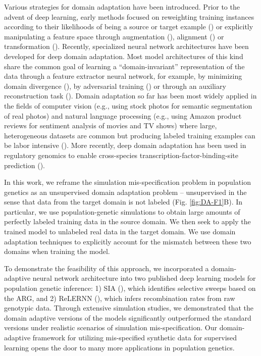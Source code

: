Various strategies for domain adaptation have been introduced. Prior to the advent of deep learning, early methods focused on reweighting training instances according to their likelihoods of being a source or target example (\cite{shimodaira_improving_2000,dai_boosting_2007}) or explicitly manipulating a feature space through augmentation (\cite{daume_iii_frustratingly_2009}), alignment (\cite{fernando_unsupervised_2013,sun_return_2016}) or transformation (\cite{pan_domain_2011}). Recently, specialized neural network architectures have been developed for deep domain adaptation. Most model architectures of this kind share the common goal of learning a “domain-invariant” representation of the data through a feature extractor neural network, for example, by minimizing domain divergence (\cite{rozantsev_beyond_2019}), by adversarial training (\cite{ganin_unsupervised_2014,liu_coupled_2016}) or through an auxiliary reconstruction task (\cite{ghifary_deep_2016}). Domain adaptation so far has been most widely applied in the fields of computer vision (e.g., using stock photos for semantic segmentation of real photos) and natural language processing (e.g., using Amazon product reviews for sentiment analysis of movies and TV shows) where large, heterogeneous datasets are common but producing labeled training examples can be labor intensive (\cite{wilson_survey_2020}). More recently, deep domain adaptation has been used in regulatory genomics to enable cross-species transcription-factor-binding-site prediction (\cite{cochran_domain-adaptive_2022}).

In this work, we reframe the simulation mis-specification problem in population genetics as an unsupervised domain adaptation problem -- unsupervised in the sense that data from the target domain is not labeled (Fig. \ref{fig:DA-F1}B). In particular, we use population-genetic simulations to obtain large amounts of perfectly labeled training data in the source domain. We then seek to apply the trained model to unlabeled real data in the target domain. We use domain adaptation techniques to explicitly account for the mismatch between these two domains when training the model.

To demonstrate the feasibility of this approach, we incorporated a domain-adaptive neural network architecture into two published deep learning models for population genetic inference: 1) SIA (\cite{hejase_deep-learning_2022}), which identifies selective sweeps based on the \acf{ARG}, and 2) ReLERNN (\cite{adrion_predicting_2020}), which infers recombination rates from raw genotypic data. Through extensive simulation studies, we demonstrated that the domain adaptive versions of the models significantly outperformed the standard versions under realistic scenarios of simulation mis-specification. Our domain-adaptive framework for utilizing mis-specified synthetic data for supervised learning opens the door to many more applications in population genetics.

